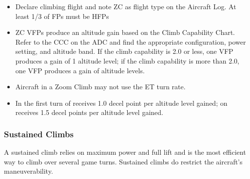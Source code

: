 \begin{itemize}

    \item{} Declare climbing flight and note ZC as flight type on the Aircraft Log. At least 1/3 of FPs must be HFPs

    \item{} ZC VFPs produce an altitude gain based on the Climb Capability Chart. Refer to the CCC on the ADC and find the appropriate configuration, power setting, and altitude band. If the climb capability is 2.0 or less, one VFP produces a gain of 1 altitude level; if the climb capability is more than 2.0, one VFP produces a gain of  altitude levels.

    \item{} Aircraft in a Zoom Climb may not use the ET turn rate.

    \item{} In the first turn of  receives 1.0 decel point per altitude level gained; on  receives 1.5 decel points per altitude level gained.

\end{itemize}

\subsubsection{Sustained Climbs}

A sustained climb relies on maximum power and full lift and is the most efficient way to climb over several game turns. Sustained climbs do restrict the aircraft's maneuverability.

